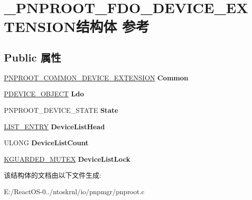 \hypertarget{struct___p_n_p_r_o_o_t___f_d_o___d_e_v_i_c_e___e_x_t_e_n_s_i_o_n}{}\section{\+\_\+\+P\+N\+P\+R\+O\+O\+T\+\_\+\+F\+D\+O\+\_\+\+D\+E\+V\+I\+C\+E\+\_\+\+E\+X\+T\+E\+N\+S\+I\+O\+N结构体 参考}
\label{struct___p_n_p_r_o_o_t___f_d_o___d_e_v_i_c_e___e_x_t_e_n_s_i_o_n}
\subsection*{Public 属性}
\begin{DoxyCompactItemize}
\item 
\mbox{\label{struct___p_n_p_r_o_o_t___f_d_o___d_e_v_i_c_e___e_x_t_e_n_s_i_o_n_acc28bafc3eaba518fa38658fc46f35a1}} 
\hyperlink{struct___p_n_p_r_o_o_t___c_o_m_m_o_n___d_e_v_i_c_e___e_x_t_e_n_s_i_o_n}{P\+N\+P\+R\+O\+O\+T\+\_\+\+C\+O\+M\+M\+O\+N\+\_\+\+D\+E\+V\+I\+C\+E\+\_\+\+E\+X\+T\+E\+N\+S\+I\+ON} {\bfseries Common}
\item 
\mbox{\label{struct___p_n_p_r_o_o_t___f_d_o___d_e_v_i_c_e___e_x_t_e_n_s_i_o_n_a51c088e4fbf7f4d18612f7a657280610}} 
\hyperlink{struct___d_e_v_i_c_e___o_b_j_e_c_t}{P\+D\+E\+V\+I\+C\+E\+\_\+\+O\+B\+J\+E\+CT} {\bfseries Ldo}
\item 
\mbox{\label{struct___p_n_p_r_o_o_t___f_d_o___d_e_v_i_c_e___e_x_t_e_n_s_i_o_n_af16b689bfa4ddd755f7848cbd6089fd2}} 
P\+N\+P\+R\+O\+O\+T\+\_\+\+D\+E\+V\+I\+C\+E\+\_\+\+S\+T\+A\+TE {\bfseries State}
\item 
\mbox{\label{struct___p_n_p_r_o_o_t___f_d_o___d_e_v_i_c_e___e_x_t_e_n_s_i_o_n_ac0b534eeae2d9ef0771b6527359c739c}} 
\hyperlink{struct___l_i_s_t___e_n_t_r_y}{L\+I\+S\+T\+\_\+\+E\+N\+T\+RY} {\bfseries Device\+List\+Head}
\item 
\mbox{\label{struct___p_n_p_r_o_o_t___f_d_o___d_e_v_i_c_e___e_x_t_e_n_s_i_o_n_aa30560cd93ed4567e4ecbb84ad3020aa}} 
U\+L\+O\+NG {\bfseries Device\+List\+Count}
\item 
\mbox{\label{struct___p_n_p_r_o_o_t___f_d_o___d_e_v_i_c_e___e_x_t_e_n_s_i_o_n_a62e12e0b67bce8829b699b090dd68ac3}} 
\hyperlink{struct___k_g_u_a_r_d_e_d___m_u_t_e_x}{K\+G\+U\+A\+R\+D\+E\+D\+\_\+\+M\+U\+T\+EX} {\bfseries Device\+List\+Lock}
\end{DoxyCompactItemize}


该结构体的文档由以下文件生成\+:\begin{DoxyCompactItemize}
\item 
E\+:/\+React\+O\+S-\/0../ntoskrnl/io/pnpmgr/pnproot.\+c\end{DoxyCompactItemize}
